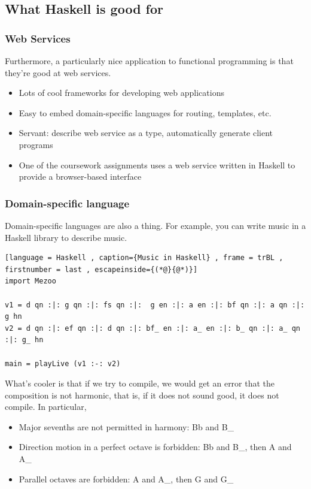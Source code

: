 \documentclass[a4paper]{article}
\theoremstyle{plain}
\theoremstyle{definition}
\theoremstyle{remark}
\begin{document}
\subsection{What Haskell is good for}
\subsubsection{Web Services}

Furthermore, a particularly nice application to functional programming is that they're good at web services. 
\begin{itemize}
	\item Lots of cool frameworks for developing web applications
	\item Easy to embed domain-specific languages for routing, templates, etc.
	\item Servant: describe web service as a type, automatically generate client programs 
	\item One of the coursework assignments uses a web service written in Haskell to provide a browser-based interface
\end{itemize}
\subsubsection{Domain-specific language}

Domain-specific languages are also a thing. For example, you can write music in a Haskell library to describe music.
\begin{lstlisting}[language = Haskell , caption={Music in Haskell} , frame = trBL , firstnumber = last , escapeinside={(*@}{@*)}]
import Mezoo

v1 = d qn :|: g qn :|: fs qn :|:  g en :|: a en :|: bf qn :|: a qn :|: g hn
v2 = d qn :|: ef qn :|: d qn :|: bf_ en :|: a_ en :|: b_ qn :|: a_ qn :|: g_ hn

main = playLive (v1 :-: v2)
\end{lstlisting}
What's cooler is that if we try to compile, we would get an error that the composition is not harmonic, that is, if it does not sound good, it does not compile. In particular,
\begin{itemize}
	\item Major sevenths are not permitted in harmony: Bb and B\_
	\item Direction motion in a perfect octave is forbidden: Bb and B\_, then A and A\_
	\item Parallel octaves are forbidden: A and A\_, then G and G\_
\end{itemize}
\end{document}
